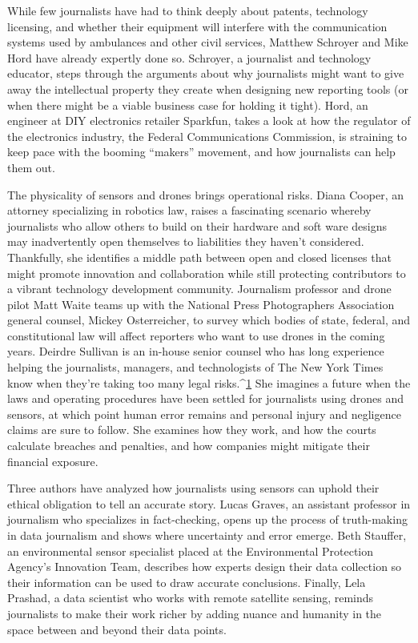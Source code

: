 While few journalists have had to think deeply about patents, technology
licensing, and whether their equipment will interfere with the communication
systems used by ambulances and other civil services, Matthew Schroyer
and Mike Hord have already expertly done so. Schroyer, a journalist and
technology educator, steps through the arguments about why journalists
might want to give away the intellectual property they create when designing
new reporting tools (or when there might be a viable business case for
holding it tight). Hord, an engineer at DIY electronics retailer Sparkfun,
takes a look at how the regulator of the electronics industry, the Federal
Communications Commission, is straining to keep pace with the booming
``makers'' movement, and how journalists can help them out.

The physicality of sensors and drones brings operational risks. Diana Cooper,
an attorney specializing in robotics law, raises a fascinating scenario
whereby journalists who allow others to build on their hardware and soft
ware designs may inadvertently open themselves to liabilities they haven't
considered. Thankfully, she identifies a middle path between open and
closed licenses that might promote innovation and collaboration while still
protecting contributors to a vibrant technology development community.
Journalism professor and drone pilot Matt Waite teams up with the National
Press Photographers Association general counsel, Mickey Osterreicher, to
survey which bodies of state, federal, and constitutional law will affect
reporters who want to use drones in the coming years. Deirdre Sullivan is
an in-house senior counsel who has long experience helping the journalists,
managers, and technologists of The New York Times know when they're taking
too many legal risks.^{\href{#endnotes-syed}{1}} She imagines a future when the laws and operating
procedures have been settled for journalists using drones and sensors, at
which point human error remains and personal injury and negligence
claims are sure to follow. She examines how they work, and how the courts
calculate breaches and penalties, and how companies might mitigate their
financial exposure.

Three authors have analyzed how journalists using sensors can uphold their
ethical obligation to tell an accurate story. Lucas Graves, an assistant professor
in journalism who specializes in fact-checking, opens up the process
of truth-making in data journalism and shows where uncertainty and error
emerge. Beth Stauffer, an environmental sensor specialist placed at the Environmental
Protection Agency's Innovation Team, describes how experts
design their data collection so their information can be used to draw accurate
conclusions. Finally, Lela Prashad, a data scientist who works with remote
satellite sensing, reminds journalists to make their work richer by adding
nuance and humanity in the space between and beyond their data points.


